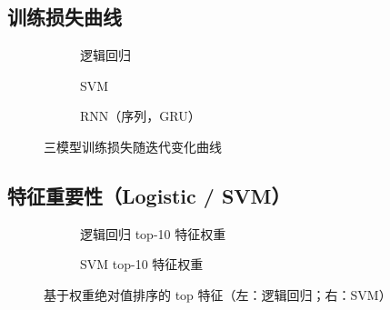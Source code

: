 \subsection{训练损失曲线}
\begin{figure}[htbp]
    \centering
    \begin{subfigure}[b]{0.32\textwidth}
        \centering
        \caption{逻辑回归}
    \end{subfigure}\hfill
    \begin{subfigure}[b]{0.32\textwidth}
        \centering
        \caption{SVM}
    \end{subfigure}\hfill
    \begin{subfigure}[b]{0.32\textwidth}
        \centering
        \caption{RNN（序列，GRU）}
    \end{subfigure}
    \caption{三模型训练损失随迭代变化曲线}
\end{figure}

\subsection{特征重要性（Logistic / SVM）}
\begin{figure}[htbp]
    \centering
    \begin{subfigure}[b]{0.48\textwidth}
        \centering
        \caption{逻辑回归 top-10 特征权重}
    \end{subfigure}\hfill
    \begin{subfigure}[b]{0.48\textwidth}
        \centering
        \caption{SVM top-10 特征权重}
    \end{subfigure}
    \caption{基于权重绝对值排序的 top 特征（左：逻辑回归；右：SVM）}
\end{figure}

\newpage
